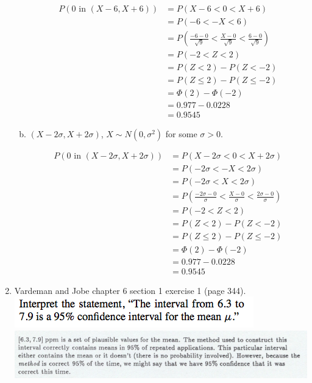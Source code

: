 \documentclass{article}\usepackage{graphicx, color}
\numberwithin{equation}{section}
\begin{document}
\begin{flushleft}
\begin{enumerate}[1. ]
\begin{enumerate}[a. ]
\color{red}
\begin{align*}
P( 0 \text{ in } (X-6, X+6)) & = P(X-6 < 0 < X+6) \\
& = P(-6 < -X < 6) \\
& = P \left (\frac{-6-0}{\sqrt{9}} < \frac{X-0}{\sqrt{9}} < \frac{6-0}{\sqrt{9}} \right) \\
& = P(-2 < Z < 2) \\
& = P(Z < 2) - P(Z < -2) \\
& = P(Z \le 2) - P(Z \le -2) \\
& = \Phi(2) - \Phi(-2) \\
& = 0.977 - 0.0228 \\
& = 0.9545
\end{align*}
\color{black}



\item $(X - 2 \sigma, X + 2 \sigma)$, $X \sim N(0, \sigma^2)$ for some $\sigma>0$. 

\color{red}
\begin{align*}
P(0 \text{ in } (X-2\sigma, X+2\sigma)) & = P(X-2\sigma < 0 < X+2 \sigma ) \\
& = P(-2  \sigma < -X < 2 \sigma) \\
& = P(-2 \sigma < X < 2 \sigma) \\
& = P \left (\frac{-2 \sigma -0}{\sigma} < \frac{X-0}{\sigma} < \frac{2 \sigma -0}{\sigma} \right) \\
& = P(-2 < Z < 2) \\
& = P(Z < 2) - P(Z < -2) \\
& = P(Z \le 2) - P(Z \le -2) \\
& = \Phi(2) - \Phi(-2) \\
& = 0.977 - 0.0228 \\
& = 0.9545
\end{align*}
\color{black}
\end{enumerate}





\item Vardeman and Jobe chapter 6 section 1 exercise 1 (page 344).
 \includegraphics{../../fig/h8p1.png}
 \includegraphics{../../fig/h8p1sol.png}



\end{enumerate}
\end{flushleft}
\end{document}
